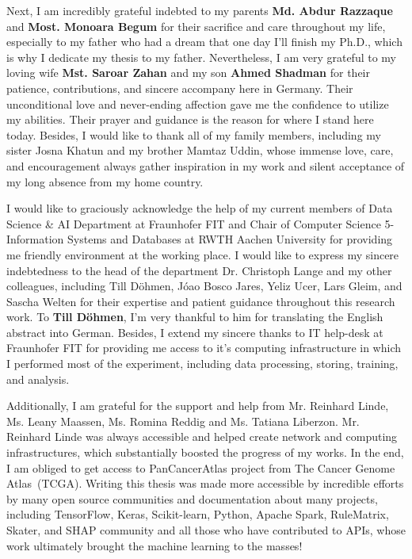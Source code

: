 \begin{acknowledgements}
    \hspace*{5mm} Next, I am incredibly grateful indebted to my parents \textbf{Md. Abdur Razzaque} and \textbf{Most. Monoara Begum} for their sacrifice and care throughout my life, especially to my father who had a dream that one day I'll finish my Ph.D., which is why I dedicate my thesis to my father. Nevertheless, I am very grateful to my loving wife \textbf{Mst. Saroar Zahan} and my son \textbf{Ahmed Shadman} for their patience, contributions, and sincere accompany here in Germany. Their unconditional love and never-ending affection gave me the confidence to utilize my abilities. Their prayer and guidance is the reason for where I stand here today. Besides, I would like to thank all of my family members, including my sister Josna Khatun and my brother Mamtaz Uddin, whose immense love, care, and encouragement always gather inspiration in my work and silent acceptance of my long absence from my home country. 
    
    \hspace*{5mm} I would like to graciously acknowledge the help of my current members of Data Science \& AI Department at Fraunhofer FIT and Chair of Computer Science 5- Information Systems and Databases at RWTH Aachen University for providing me friendly environment at the working place. I would like to express my sincere indebtedness to the head of the department Dr. Christoph Lange and my other colleagues, including Till D{\"o}hmen, J{\'o}ao Bosco Jares, Yeliz Ucer, Lars Gleim, and Sascha Welten for their expertise and patient guidance throughout this research work. To \textbf{Till D{\"o}hmen}, I'm very thankful to him for translating the English abstract into German. Besides, I extend my sincere thanks to IT help-desk at Fraunhofer FIT for providing me access to it's computing infrastructure in which I performed most of the experiment, including data processing, storing, training, and analysis.
    
    \hspace*{5mm} Additionally, I am grateful for the support and help from Mr. Reinhard Linde, Ms. Leany Maassen, Ms. Romina Reddig and Ms. Tatiana Liberzon. Mr. Reinhard Linde was always accessible and helped create network and computing infrastructures, which substantially boosted the progress of my works. In the end, I am obliged to get access to PanCancerAtlas project from The Cancer Genome Atlas~(TCGA). Writing this thesis was made more accessible by incredible efforts by many open source communities and documentation about many projects, including TensorFlow, Keras, Scikit-learn, Python, Apache Spark, RuleMatrix, Skater, and SHAP community and all those who have contributed to APIs, whose work ultimately brought the machine learning to the masses!
    

\end{acknowledgements}
